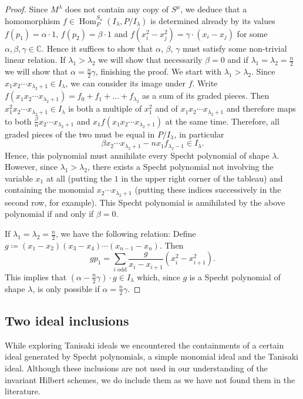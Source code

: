 \documentclass[11pt]{amsart}
\theoremstyle{definition}
\newcommand{\CC}{\mathbb{C}}
\DeclareMathOperator{\Hom}{Hom}
\begin{document}
\begin{proof}
	Since $M^\lambda$ does not contain any copy of $S^\mu$, we deduce that a homomorphism $f \in \Hom_{P}^{S_n}(I_\lambda,P/I_\lambda)$ is determined already by its values $f(p_1) = \alpha \cdot 1$, $f(p_2) = \beta \cdot 1$ and $f(x_i^2-x_j^2) = \gamma \cdot (x_i - x_j)$ for some $\alpha, \beta, \gamma \in \CC$. Hence it suffices to show that $\alpha$, $\beta$, $\gamma$ must satisfy some non-trivial linear relation. If $\lambda_1 > \lambda_2$ we will show that necessarily $\beta = 0$ and if $\lambda_1 = \lambda_2 = \frac{n}{2}$ we will show that $\alpha = \frac{n}{2} \gamma$, finishing the proof. We start with $\lambda_1 > \lambda_2$. Since $x_1 x_2 \cdots x_{\lambda_2+1} \in I_\lambda$, we can consider its image under $f$. Write $f(x_1 x_2 \cdots x_{\lambda_2+1}) = f_0 + f_1 + \ldots + f_{\lambda_2}$ as a sum of its graded pieces. Then $x_1^2 x_2 \cdots x_{\lambda_2 + 1} \in I_\lambda$ is both a multiple of $x_1^2$ and of $x_1 x_2 \cdots x_{\lambda_2+1}$ and therefore maps to both $\frac{\beta}{n} x_2 \cdots x_{\lambda_2 + 1}$ and $x_1 f(x_1 x_2 \cdots x_{\lambda_2+1})$ at the same time. Therefore, all graded pieces of the two must be equal in $P/I_\lambda$, in particular
	\begin{equation*}
		\beta x_2 \cdots x_{\lambda_2 + 1} - n x_1 f_{\lambda_2 - 1} \in I_\lambda.
	\end{equation*}
	Hence, this polynomial must annihilate every Specht polynomial of shape $\lambda$. However, since $\lambda_1 > \lambda_2$, there exists a Specht polynomial not involving the variable $x_1$ at all (putting the $1$ in the upper right corner of the tableau) and containing the monomial $x_2 \cdots x_{\lambda_2 + 1}$ (putting these indices successively in the second row, for example). This Specht polynomial is annihilated by the above polynomial if and only if $\beta = 0$.
		
	If $\lambda_1 = \lambda_2 = \frac{n}{2}$, we have the following relation: Define $g \coloneqq (x_1-x_2) (x_3-x_4) \cdots (x_{n-1} - x_n)$. Then
	\begin{equation*}
		g p_1 = \sum_{i \text{ odd}} \frac{g}{x_i - x_{i+1}} (x_i^2 - x_{i+1}^2).
	\end{equation*}
	This implies that $(\alpha - \frac{n}{2}\gamma) \cdot g \in I_\lambda$ which, since $g$ is a Specht polynomial of shape $\lambda$, is only possible if $\alpha = \frac{n}{2} \gamma$.
\end{proof}

\subsection{Two ideal inclusions}
While exploring Tanisaki ideals we encountered the containments of a certain ideal generated by Specht polynomials, a simple monomial ideal and the Tanisaki ideal. Although these inclusions are not used in our understanding of the invariant Hilbert schemes, we do include them as we have not found them in the literature.
\end{document}

